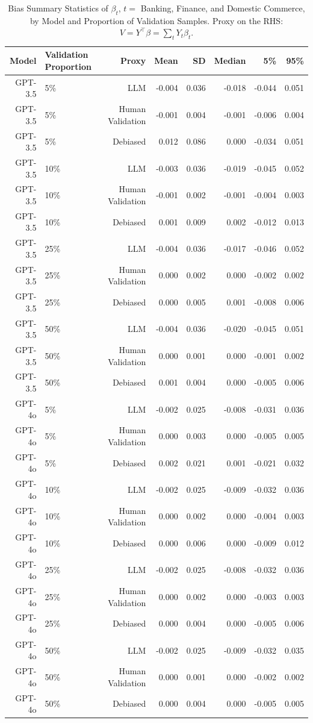 \begin{table}

\caption{Bias Summary Statistics of $\beta_{t}$, $t=$ Banking, Finance, and Domestic Commerce, by Model and Proportion of Validation Samples.
      Proxy on the RHS: $V = Y^\top \beta = \sum_{t} Y_t \beta_t$.}
\centering
\begin{tabular}[t]{rlrrrrrr}
\toprule
Model & Validation Proportion & Proxy & Mean & SD & Median & 5\% & 95\%\\
\midrule
GPT-3.5 & 5\% & LLM & -0.004 & 0.036 & -0.018 & -0.044 & 0.051\\
GPT-3.5 & 5\% & Human Validation & -0.001 & 0.004 & -0.001 & -0.006 & 0.004\\
GPT-3.5 & 5\% & Debiased & 0.012 & 0.086 & 0.000 & -0.034 & 0.051\\
GPT-3.5 & 10\% & LLM & -0.003 & 0.036 & -0.019 & -0.045 & 0.052\\
GPT-3.5 & 10\% & Human Validation & -0.001 & 0.002 & -0.001 & -0.004 & 0.003\\
GPT-3.5 & 10\% & Debiased & 0.001 & 0.009 & 0.002 & -0.012 & 0.013\\
GPT-3.5 & 25\% & LLM & -0.004 & 0.036 & -0.017 & -0.046 & 0.052\\
GPT-3.5 & 25\% & Human Validation & 0.000 & 0.002 & 0.000 & -0.002 & 0.002\\
GPT-3.5 & 25\% & Debiased & 0.000 & 0.005 & 0.001 & -0.008 & 0.006\\
GPT-3.5 & 50\% & LLM & -0.004 & 0.036 & -0.020 & -0.045 & 0.051\\
GPT-3.5 & 50\% & Human Validation & 0.000 & 0.001 & 0.000 & -0.001 & 0.002\\
GPT-3.5 & 50\% & Debiased & 0.001 & 0.004 & 0.000 & -0.005 & 0.006\\
GPT-4o & 5\% & LLM & -0.002 & 0.025 & -0.008 & -0.031 & 0.036\\
GPT-4o & 5\% & Human Validation & 0.000 & 0.003 & 0.000 & -0.005 & 0.005\\
GPT-4o & 5\% & Debiased & 0.002 & 0.021 & 0.001 & -0.021 & 0.032\\
GPT-4o & 10\% & LLM & -0.002 & 0.025 & -0.009 & -0.032 & 0.036\\
GPT-4o & 10\% & Human Validation & 0.000 & 0.002 & 0.000 & -0.004 & 0.003\\
GPT-4o & 10\% & Debiased & 0.000 & 0.006 & 0.000 & -0.009 & 0.012\\
GPT-4o & 25\% & LLM & -0.002 & 0.025 & -0.008 & -0.032 & 0.036\\
GPT-4o & 25\% & Human Validation & 0.000 & 0.002 & 0.000 & -0.003 & 0.003\\
GPT-4o & 25\% & Debiased & 0.000 & 0.004 & 0.000 & -0.005 & 0.006\\
GPT-4o & 50\% & LLM & -0.002 & 0.025 & -0.009 & -0.032 & 0.035\\
GPT-4o & 50\% & Human Validation & 0.000 & 0.001 & 0.000 & -0.002 & 0.002\\
GPT-4o & 50\% & Debiased & 0.000 & 0.004 & 0.000 & -0.005 & 0.005\\
\bottomrule
\end{tabular}
\end{table}
